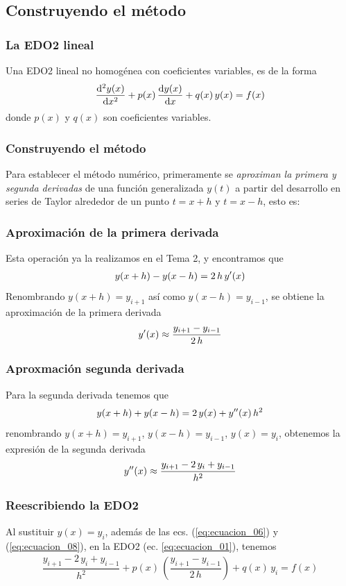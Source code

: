 \subsection{Construyendo el método}
\begin{frame}
\frametitle{La EDO2 lineal}
Una EDO2 lineal no homogénea con coeficientes variables, es de la forma
\begin{align}
\dv[2]{y(x)}{x} + p(x) \, \dv{y(x)}{x} + q(x) \, y(x) =  f(x)
\label{eq:ecuacion_01}
\end{align}
donde $p(x)$ y $q(x)$ son coeficientes variables.
\end{frame}
\begin{frame}
\frametitle{Construyendo el método}
Para establecer el método numérico, primeramente se \emph{aproximan la primera y segunda derivadas} de una función generalizada $y(t)$ a partir del desarrollo en series de Taylor alrededor de un punto $t=x+h$ y $t=x-h$, esto es:
\end{frame}
\begin{frame}
\frametitle{Aproximación de la primera derivada}
Esta operación ya la realizamos en el Tema 2, y encontramos que
\begin{align}
y(x+h) - y(x-h) =  2 \, h \, {y}^{\prime} (x)
\label{eq:ecuacion_05}
\end{align}
\pause
Renombrando $y(x+h) = y_{i+1}$ así como  $y(x-h)=y_{i-1}$, se obtiene la aproximación de la primera derivada
\begin{align}
{y}^{\prime} (x) \approx \dfrac{y_{i+1} - y_{i-1}}{2 \, h}
\label{eq:ecuacion_06}
\end{align}
\end{frame}
\begin{frame}
\frametitle{Aproxmación segunda derivada}
Para la segunda derivada tenemos que
\begin{align}
y(x+h) + y(x-h) = 2 \, y(x) + {y}^{\prime \prime} (x) \, h^{2}
\label{eq:ecuacion_07}
\end{align}
\pause
renombrando $y(x+h) = y_{i+1}$,  $y(x-h)=y_{i-1}$, $y(x) = y_{i}$, obtenemos la expresión de la segunda derivada
\begin{align}
{y}^{\prime \prime}(x) \approx \dfrac{y_{i+1} - 2 \, y_{i} + y_{i-1}}{h^{2}}
\label{eq:ecuacion_08}
\end{align}
\end{frame}
\begin{frame}
\frametitle{Reescribiendo la EDO2}
Al sustituir $y(x)=y_{i}$, además de las ecs. (\ref{eq:ecuacion_06}) y (\ref{eq:ecuacion_08}), en la EDO2 (ec. \ref{eq:ecuacion_01}), tenemos
\fontsize{12}{12}\selectfont
\begin{align}
\dfrac{y_{i+1} - 2 \, y_{i} + y_{i-1}}{h^{2}} + p(x) \, \left( \dfrac{y_{i+1} - y_{i-1}}{2 \, h}  \right) + q(x) \, y_{i} = f(x)
\label{eq:ecuacion_09}
\end{align}
\end{frame}
